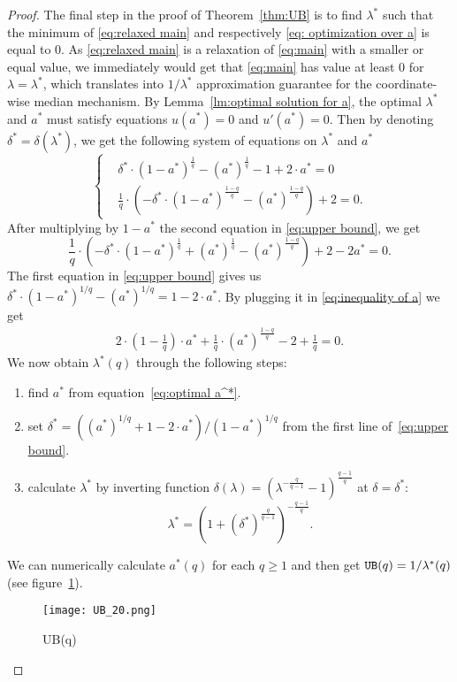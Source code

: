 \begin{proof}
The final step in the proof of Theorem~\ref{thm:UB} is to find $\lambda^*$ such that the minimum of \eqref{eq:relaxed main} and respectively \eqref{eq: optimization over a} is equal to $0$.
As \eqref{eq:relaxed main} is a relaxation of \eqref{eq:main} with a smaller or equal value, we immediately would get that \eqref{eq:main} has value at least $0$ for $\lambda=\lambda^*$, which translates into $1/\lambda^*$ approximation guarantee for the coordinate-wise median mechanism. By Lemma~\ref{lm:optimal solution for a}, the optimal $\lambda^*$ and $a^*$ must satisfy equations $u(a^*)=0$ and $u'(a^*)=0$. Then by denoting $\delta^*=\delta(\lambda^*)$, we get the following system of equations on $\lambda^*$ and $a^*$
\begin{equation}
\label{eq:upper bound}
\left\{
    \begin{aligned}
    &\delta^*\cdot(1-a^*)^{\frac{1}{q}}-{(a^*)}^{\frac{1}{q}}-1+2\cdot a^*=0\\
    &\frac{1}{q}\cdot\left(-\delta^*\cdot(1-a^*)^{\frac{1-q}{q}}-(a^*)^{\frac{1-q}{q}}\right)+2=0.
    \end{aligned}
    \right.
\end{equation}
After multiplying by $1-a^*$ the second equation in \eqref{eq:upper bound}, we get
\begin{equation}
\label{eq:inequality of a}
    \frac{1}{q}\cdot\left(-\delta^*\cdot(1-a^*)^{\frac{1}{q}}+(a^*)^{\frac{1}{q}}-(a^*)^{\frac{1-q}{q}}\right)+2-2a^*=0.
\end{equation}
The first equation in \eqref{eq:upper bound} gives us $\delta^*\cdot(1-a^*)^{1/q}-{(a^*)}^{1/q}=1-2\cdot a^*$. By plugging it in \eqref{eq:inequality of a} we get
\begin{align}
    \label{eq:optimal a^*}
    2\cdot\left(1-\frac{1}{q}\right)\cdot a^*+\frac{1}{q}\cdot (a^*)^{\frac{1-q}{q}}-2+\frac{1}{q}=0.
\end{align}
We now obtain $\lambda^*(q)$ through the following steps:
\begin{enumerate}[label=(\roman*)]
        \item find $a^*$ from equation~\eqref{eq:optimal a^*}.
        \item set $\delta^*=\left((a^*)^{1/q}+1-2\cdot a^*\right)/(1-a^*)^{1/q}$ from the first line of~\eqref{eq:upper bound}.
        \item calculate $\lambda^*$ by inverting function $\delta(\lambda)=\left(\lambda^{-\frac{q}{q-1}}-1\right)^{\frac{q-1}{q}}$ at $\delta=\delta^*$:
        \[
        \lambda^*=\left(1+(\delta^*)^{\frac{q}{q-1}}\right)^{-\frac{q-1}{q}}.
        \]
\end{enumerate}
We can numerically calculate $a^*(q)$ for each $q\ge 1$ and then get $\texttt{UB}(q)=1/\lambda^*(q)$ (see figure~\ref{fig:UB(q)}).
\begin{figure}[htb] 
		\centering
		\texttt{[image: UB\_20.png]}
		\caption{UB(q)}
\label{fig:UB(q)}		
\end{figure}


\end{proof}
